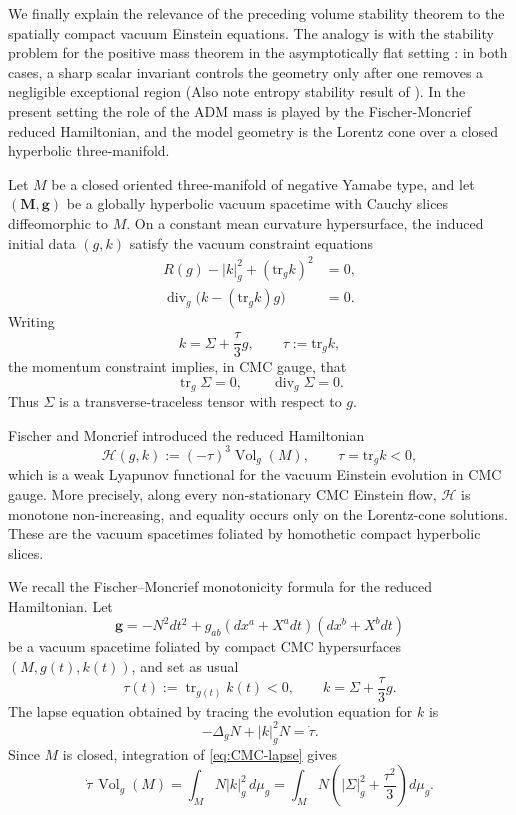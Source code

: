 \documentclass{amsart}
\newcommand{\tr}{\mbox{tr}}
\begin{document}
We finally explain the relevance of the preceding volume stability theorem to the spatially compact vacuum Einstein equations.  The analogy is with the
stability problem for the positive mass theorem in the asymptotically flat
setting \cite{dong2025stability}
: in both cases, a sharp scalar invariant controls the geometry only
after one removes a negligible exceptional region (Also note entropy stability result of \cite{song2025entropy}). In the present setting the
role of the ADM mass is played by the Fischer-Moncrief reduced Hamiltonian,
and the model geometry is the Lorentz cone over a closed hyperbolic
three-manifold.

\noindent Let \(M\) be a closed oriented three-manifold of negative Yamabe type, and let
\((\mathbf M,\mathbf g)\) be a globally hyperbolic vacuum spacetime with Cauchy
slices diffeomorphic to \(M\).  On a constant mean curvature hypersurface, the
induced initial data \((g,k)\) satisfy the vacuum constraint equations
\begin{align}
\label{eq:HC}
        R(g)-|k|_{g}^{2}+(\tr_g k)^2 &=0,\\
\label{eq:MC}
        \operatorname{div}_{g}\bigl(k-(\tr_g k)g\bigr)&=0.
\end{align}
Writing
\[
        k=\Sigma+\frac{\tau}{3}g,
        \qquad
        \tau:=\tr_g k,
\]
the momentum constraint implies, in CMC gauge, that
\[
        \operatorname{tr}_g\Sigma=0,
        \qquad
        \operatorname{div}_g\Sigma=0.
\]
Thus \(\Sigma\) is a transverse-traceless tensor with respect to \(g\).

\noindent Fischer and Moncrief introduced the reduced Hamiltonian
\begin{equation}
\label{eq:FM-Hamiltonian}
        \mathcal H(g,k):=(-\tau)^3\operatorname{Vol}_g(M),
        \qquad \tau=\tr_g k<0,
\end{equation}
which is a weak Lyapunov functional for the vacuum Einstein evolution in CMC
gauge.  More precisely, along every non-stationary CMC Einstein flow,
\(\mathcal H\) is monotone non-increasing, and equality occurs only on the
Lorentz-cone solutions.  These are the vacuum spacetimes foliated by homothetic
compact hyperbolic slices.  


\noindent We recall the Fischer--Moncrief monotonicity formula for the reduced
Hamiltonian. Let
\[
        \mathbf g
        =
        -N^2dt^2
        +
        g_{ab}(dx^a+X^a dt)(dx^b+X^b dt)
\]
be a vacuum spacetime foliated by compact CMC hypersurfaces
\((M,g(t),k(t))\), and set as usual
\[
        \tau(t):=\operatorname{tr}_{g(t)}k(t)<0,
        \qquad
        k=\Sigma+\frac{\tau}{3}g.
\]
The lapse equation obtained by tracing the evolution equation for
\(k\) is
\begin{equation}
\label{eq:CMC-lapse}
        -\Delta_g N+|k|_g^2N=\dot\tau .
\end{equation}
Since \(M\) is closed, integration of \eqref{eq:CMC-lapse} gives
\begin{equation}
\label{eq:integrated-lapse}
        \dot\tau\,\operatorname{Vol}_g(M)
        =
        \int_M N|k|_g^2\,d\mu_g
        =
        \int_M N
        \left(
        |\Sigma|_g^2+\frac{\tau^2}{3}
        \right)d\mu_g .
\end{equation}
\end{document}
